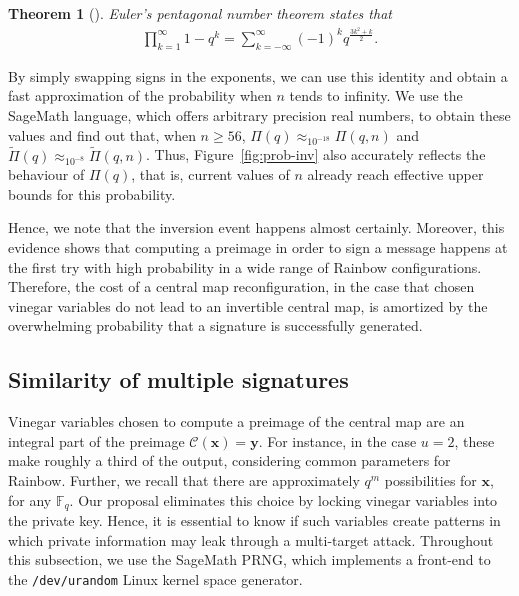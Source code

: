 \documentclass[12pt, a4paper, oneside]{memoir}
\newtheorem{theorem}{Theorem}[section]
\theoremstyle{definition}
\begin{document}
\begin{theorem}[{\cite[Thm.~14.3]{Apostol:2010}}]
  Euler's pentagonal number theorem states that
  \begin{align}
    \prod_{k = 1}^{\infty} 1 - q^{k} = \sum_{k = -\infty}^{\infty}
    {(-1)}^{k} q^{\frac{3k^{2} + k}{2}}.
  \end{align}
\end{theorem}

By simply swapping signs in the exponents, we can use this identity and obtain a fast approximation of the probability when $n$ tends to infinity. We use the SageMath language, which offers arbitrary precision real numbers, to obtain these values and find out that, when $n \geq 56$, $\Pi(q) \approx_{10^{-18}} \Pi(q, n)$ and $\widetilde{\Pi}(q) \approx_{10^{-8}} \widetilde{\Pi}(q, n)$. Thus, Figure~\ref{fig:prob-inv} also accurately reflects the behaviour of $\Pi(q)$, that is, current values of $n$ already reach effective upper bounds for this probability.

Hence, we note that the inversion event happens almost certainly. Moreover, this evidence shows that computing a preimage in order to sign a message happens at the first try with high probability in a wide range of Rainbow configurations. Therefore, the cost of a central map reconfiguration, in the case that chosen vinegar variables do not lead to an invertible central map, is amortized by the overwhelming probability that a signature is successfully generated.

\subsection{Similarity of multiple signatures}\label{subsec:similar}

Vinegar variables chosen to compute a preimage of the central map are an integral part of the
preimage $\mathcal{C}(\mathbf{x}) = \mathbf{y}$. For instance, in the case $u = 2$, these make roughly a third of the output, considering common parameters for Rainbow. Further, we recall that there are approximately $q^{m}$ possibilities for $\mathbf{x}$, for any $\mathbb{F}_{q}$. Our proposal eliminates this choice by locking vinegar variables into the private key. Hence, it is essential to know if such variables create patterns in which private information may leak through a multi-target attack. Throughout this subsection, we use the SageMath PRNG, which implements a front-end to the \texttt{/dev/urandom} Linux kernel space generator.
\end{document}
